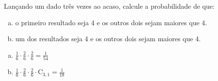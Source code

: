\begin{ex}
Lançando um dado três vezes ao acaso, calcule a probabilidade de que:
   \begin{enumerate}[(a)]
   \item o primeiro resultado seja 4 e os outros dois sejam maiores que 4.
   \item um dos resultados seja 4 e os outros dois sejam maiores que 4.
   \end{enumerate}
     \begin{sol}
      \phantom{A}
        \begin{enumerate} [(a)]
            \item $\frac{1}{6}\cdot\frac{2}{6}\cdot\frac{2}{6}=\frac{1}{54}$
            \item $\frac{1}{6}\cdot\frac{2}{6}\cdot\frac{2}{6}\cdot\mathrm{C}_{3,1}=\frac{1}{18}$ 
        \end{enumerate}
     \end{sol}
\end{ex}